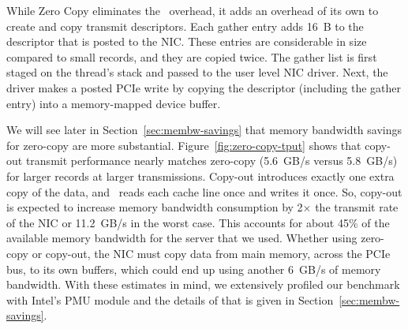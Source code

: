 While Zero Copy eliminates the \memcpy ~overhead, it adds an overhead of its own to create and copy transmit descriptors.
Each gather entry adds 16~B to the descriptor that is posted to the NIC.
These entries are considerable in size compared to
small records, and they are copied twice. The gather list
is first staged on the thread's stack and passed to the user level NIC driver. Next,
the driver makes a posted PCIe write by copying the descriptor (including the
gather entry) into a memory-mapped device buffer.

We will see later in Section~\ref{sec:membw-savings} that memory bandwidth savings for zero-copy are more substantial.
Figure~\ref{fig:zero-copy-tput} shows that copy-out transmit performance nearly
matches zero-copy (5.6~GB/s versus 5.8~GB/s) for larger records at larger transmissions. Copy-out introduces exactly one
extra copy of the data, and \memcpy~reads each cache line once and writes it
once. So, copy-out is expected to increase memory bandwidth consumption
by 2$\times$ the transmit rate of the NIC or 11.2~GB/s in the worst case.  This
accounts for about 45\% of the available memory bandwidth for the server that we used. Whether
using zero-copy or copy-out, the NIC must copy data from main memory, across the PCIe bus, to its own buffers, which
could end up using another 6~GB/s of memory bandwidth. With these estimates in mind, we extensively profiled
 our benchmark with Intel's PMU module and the details of that is given in Section~\ref{sec:membw-savings}.





